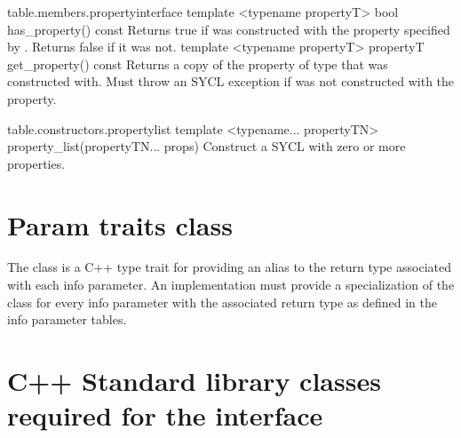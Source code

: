 {table.members.propertyinterface}
  \addRowTwoSL
    { template <typename propertyT> }  
    { bool has_property() const }
    {
      Returns true if  was constructed with the property
      specified by . Returns false if it was
      not.
    }
  \addRowTwoSL
    { template <typename propertyT> }  
    { propertyT get_property() const }
    {
      Returns a copy of the property of type 
      that  was constructed with. Must throw an
       SYCL exception if  was not constructed with the  property.
    }
\completeTable

{table.constructors.propertylist}
\addRowTwoSL
{ template <typename... propertyTN> }
{ property_list(propertyTN... props) }
{
  Construct a SYCL  with zero or more properties.
}
\completeTable

\section{Param traits class}
\label{sec:param-traits}

The class  is a C++ type trait for providing an alias to the return type associated with each info parameter. An implementation must provide a specialization of the  class for every info
parameter with the associated return type as defined in the info
parameter tables.



\section{C++ Standard library classes required for the interface}
\label{sec:stlclasses}

